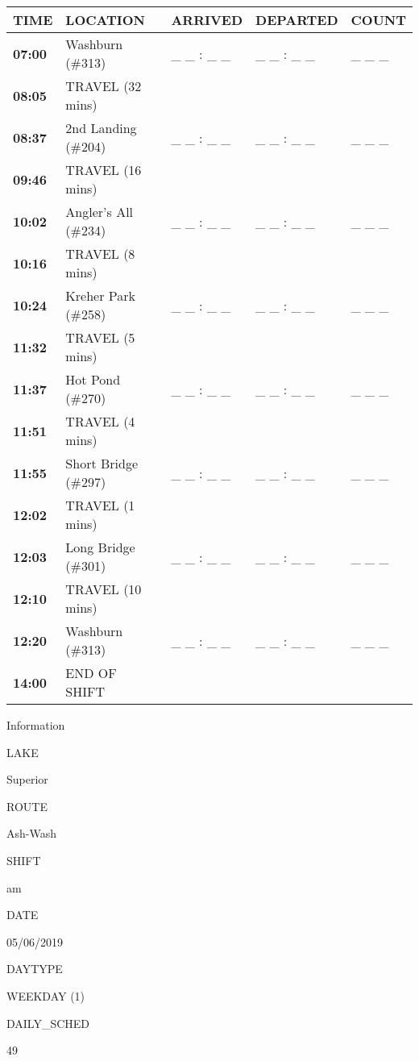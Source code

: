 \documentclass[]{article}
\begin{document}
\begin{tabular}{>{\bfseries}lllll}
\toprule
\textbf{TIME} & \textbf{LOCATION} & \textbf{ARRIVED} & \textbf{DEPARTED} & \textbf{COUNT}\\
\midrule
07:00 & Washburn (\#313) & \_ \_ : \_ \_ & \_ \_ : \_ \_ & \_ \_ \_\\
08:05 & TRAVEL (32 mins) &  &  & \\
08:37 & 2nd Landing (\#204) & \_ \_ : \_ \_ & \_ \_ : \_ \_ & \_ \_ \_\\
09:46 & TRAVEL (16 mins) &  &  & \\
10:02 & Angler's All (\#234) & \_ \_ : \_ \_ & \_ \_ : \_ \_ & \_ \_ \_\\
10:16 & TRAVEL (8 mins) &  &  & \\
10:24 & Kreher Park (\#258) & \_ \_ : \_ \_ & \_ \_ : \_ \_ & \_ \_ \_\\
11:32 & TRAVEL (5 mins) &  &  & \\
11:37 & Hot Pond (\#270) & \_ \_ : \_ \_ & \_ \_ : \_ \_ & \_ \_ \_\\
11:51 & TRAVEL (4 mins) &  &  & \\
11:55 & Short Bridge (\#297) & \_ \_ : \_ \_ & \_ \_ : \_ \_ & \_ \_ \_\\
12:02 & TRAVEL (1 mins) &  &  & \\
12:03 & Long Bridge (\#301) & \_ \_ : \_ \_ & \_ \_ : \_ \_ & \_ \_ \_\\
12:10 & TRAVEL (10 mins) &  &  & \\
12:20 & Washburn (\#313) & \_ \_ : \_ \_ & \_ \_ : \_ \_ & \_ \_ \_\\
14:00 & END OF SHIFT &  &  & \\
\bottomrule
\end{tabular}\newpage

Information

LAKE

Superior

ROUTE

Ash-Wash

SHIFT

am

DATE

05/06/2019

DAYTYPE

WEEKDAY (1)

DAILY\_SCHED

49

\vspace{24pt}
\end{document}
